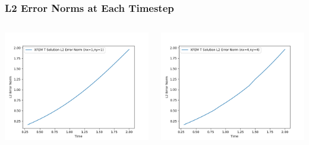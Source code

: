 \documentclass[]{beamer}
\begin{document}
\begin{frame}[t]\frametitle{L2 Error Norms at Each Timestep}
  	\begin{columns}
			\begin{center}
			\includegraphics[scale=0.4]{figures/2D_rz_ls1mat_nx1ny1_L2_Errs}
			\end{center}
			\begin{center}
			\includegraphics[scale=0.4]{figures/2D_rz_ls1mat_nx4ny4_L2_Errs}
			\end{center}
	\end{columns}
\end{frame}
\end{document}
